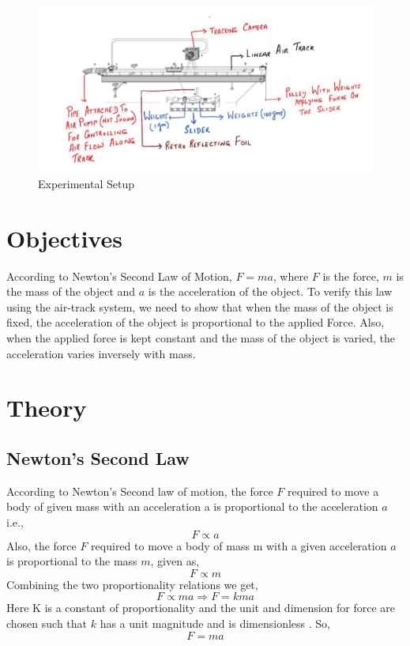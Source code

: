 \documentclass{article}
\begin{document}
	\begin{figure}[H]
		\centering
		\includegraphics[scale=0.5]{exp setup}
		\caption{Experimental Setup}
		\label{figure:exp}%
	\end{figure}

	\section{Objectives}
	According to Newton’s Second Law of Motion, $F=ma$, where $F$ is the force, $m$ is 
	the mass of the object and $a$ is the acceleration of the object. To verify this law using the air-track system, we need to show that when the mass of the object is fixed, the acceleration of 
	the object is proportional to the applied Force. Also, when the applied force is kept constant 
	and the mass of the object is varied, the acceleration varies inversely with mass.
	
	\section{Theory}
	\subsection{Newton’s Second Law}
	According to Newton’s Second law of motion, the force $F$ required to move a 
	body of given mass with an acceleration a is proportional to the acceleration $a$ 
	i.e., $$F \propto a$$
	Also, the force $F$ required to move a body of mass m with a given acceleration 
	$a$ is proportional to the mass $m$, given as, $$F \propto m$$
	Combining the two proportionality relations we get, $$F\propto ma \Rightarrow F = kma$$
	Here K is a constant of proportionality and the unit and dimension for force are 
	chosen such that $k$ has a unit magnitude and is dimensionless . So, $$F=ma$$
	
\end{document}
